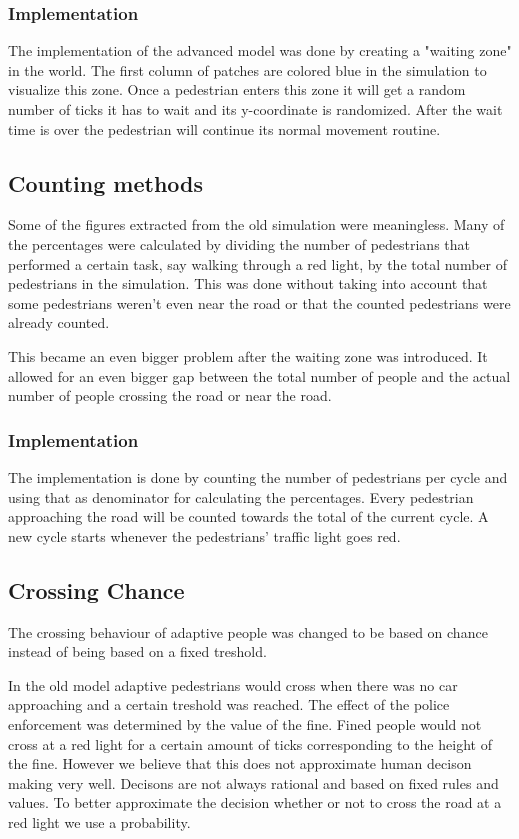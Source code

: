 \documentclass[a4paper]{article}
\begin{document}
\subsubsection{Implementation}
The implementation of the advanced model was done by creating a "waiting zone" in the world. The first column of patches are colored blue in the simulation to visualize this zone. Once a pedestrian enters this zone it will get a random number of ticks it has to wait and its y-coordinate is randomized.
After the wait time is over the pedestrian will continue its normal movement routine.

\subsection{Counting methods}
Some of the figures extracted from the old simulation were meaningless. Many of the percentages were calculated by dividing the number of pedestrians that performed a certain task, say walking through a red light, by the total number of pedestrians in the simulation. This was done without taking into account that some pedestrians weren't even near the road or that the counted pedestrians were already counted.

This became an even bigger problem after the waiting zone was introduced. It allowed for an even bigger gap between the total number of people and the actual number of people crossing the road or near the road.

\subsubsection{Implementation}
The implementation is done by counting the number of pedestrians per cycle and using that as denominator for calculating the percentages. Every pedestrian approaching the road will be counted towards the total of the current cycle. A new cycle starts whenever the pedestrians' traffic light goes red.


\subsection{Crossing Chance}
The crossing behaviour of adaptive people was changed to be based on chance instead of being based on a fixed treshold.

In the old model adaptive pedestrians would cross when there was no car approaching and a certain treshold was reached. The effect of the police enforcement was determined by the value of the fine. Fined people would not cross at a red light for a certain amount of ticks corresponding to the height of the fine. However we believe that this does not approximate human decison making very well. Decisons are not always rational and based on fixed rules and values. To better approximate the decision whether or not to cross the road at a red light we use a probability. 
\end{document}
